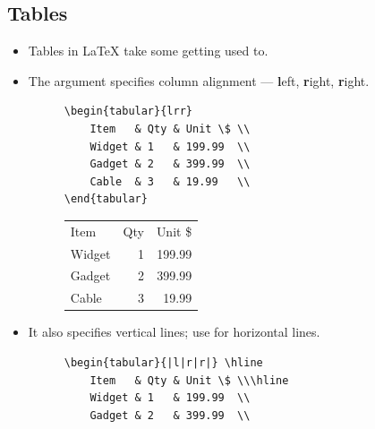 \documentclass[aspectratio=169]{beamer}
\begin{document}
\subsection{Tables}
\begin{frame}[fragile]{\insertsubsection}
\begin{itemize}
\item Tables in \LaTeX{} take some getting used to.
\item The argument specifies column alignment --- \textbf{l}eft, \textbf{r}ight, \textbf{r}ight.
\begin{figure}
    \begin{minipage}{0.5\textwidth}
        \begin{lstlisting}
\begin{tabular}{lrr}
    Item   & Qty & Unit \$ \\
    Widget & 1   & 199.99  \\
    Gadget & 2   & 399.99  \\
    Cable  & 3   & 19.99   \\
\end{tabular}
        \end{lstlisting}
    \end{minipage}
    \begin{minipage}{0.4\textwidth}
        \begin{tabular}{lrr}
        Item   & Qty & Unit \$ \\
        Widget & 1   & 199.99  \\
        Gadget & 2   & 399.99  \\
        Cable  & 3   & 19.99   \\
        \end{tabular}
    \end{minipage}
\end{figure}
\item It also specifies vertical lines; use  for horizontal lines.
\begin{figure}
    \begin{minipage}{0.5\textwidth}
        \begin{lstlisting}
\begin{tabular}{|l|r|r|} \hline
    Item   & Qty & Unit \$ \\\hline
    Widget & 1   & 199.99  \\
    Gadget & 2   & 399.99  \\

\end{lstlisting}
\end{minipage}
\end{figure}
\end{itemize}
\end{frame}
\end{document}
